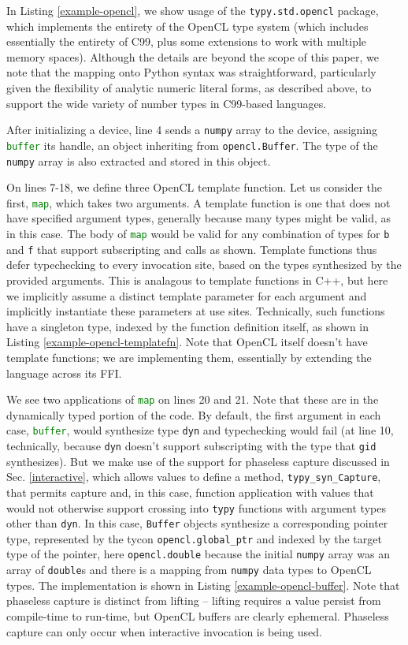 \documentclass{sigplanconf}
\newcommand{\lip}[1]{\lstinline[language=Python,basicstyle=\ttfamily\small,deletendkeywords={tuple,buffer,map}]{#1}}
\begin{document}
In Listing \ref{example-opencl}, we show usage of the \lip{typy.std.opencl} package, which implements the entirety of the OpenCL type system (which includes essentially the entirety of C99, plus some extensions to work with multiple memory spaces). Although the details are beyond the scope of this paper, we note that the mapping onto Python syntax was straightforward, particularly given the flexibility of analytic numeric literal forms, as described above, to support the wide variety of number types in C99-based languages. 

After initializing a device, line 4 sends a \lip{numpy} array to the device, assigning \lip{buffer} its handle, an object inheriting from \lip{opencl.Buffer}. The type of the \lip{numpy} array is also extracted and stored in this object.

On lines 7-18, we define three OpenCL template function. Let us consider the first, \lip{map}, which takes two arguments. A template function is one that does not have specified argument types, generally because many types might be valid, as in this case. The body of \lip{map} would be valid for any combination of types for \lip{b} and \lip{f} that support subscripting and calls as shown. Template functions thus defer typechecking to every invocation site, based on the types synthesized by the provided arguments. This is analagous to template functions in C++, but here we implicitly assume a distinct template parameter for each argument and implicitly instantiate these parameters at use sites. Technically, such functions have a singleton type, indexed by the function definition itself, as shown in Listing \ref{example-opencl-templatefn}. Note that  OpenCL itself doesn't have template functions; we are implementing them, essentially by extending the language across its FFI. 

We see two applications of \lip{map} on lines 20 and 21. Note that these are in the dynamically typed portion of the code. By default, the first argument in each case, \lip{buffer}, would synthesize type \lip{dyn} and typechecking would fail (at line 10, technically, because \lip{dyn} doesn't support subscripting with the type that \lip{gid} synthesizes).  But we make use of the support for phaseless capture discussed in Sec. \ref{interactive}, which allows values to define a method, \lip{typy_syn_Capture}, that permits capture and, in this case, function application with values that would not otherwise support crossing into \lip{typy} functions with argument types other than \lip{dyn}. In this case, \lip{Buffer} objects synthesize a corresponding pointer type, represented by the tycon \lip{opencl.global_ptr} and indexed by the target type of the pointer, here \lip{opencl.double} because the initial \lip{numpy} array was an array of \lip{double}s and there is a mapping from \lip{numpy} data types to OpenCL types. The implementation is shown in Listing \ref{example-opencl-buffer}. Note that phaseless capture is distinct from lifting -- lifting requires a value persist from compile-time to run-time, but OpenCL buffers are clearly ephemeral. Phaseless capture can only occur when interactive invocation is being used.
\end{document}
